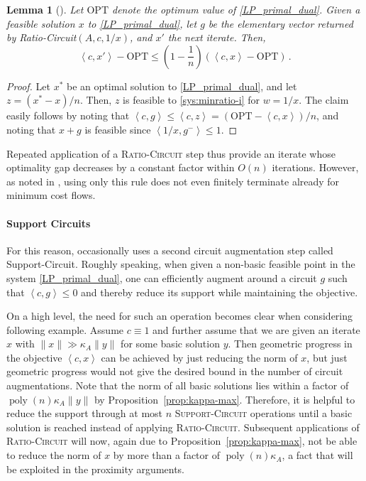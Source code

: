 \documentclass[11pt, a4paper]{article}
\newcommand{\pr}[2]{\left\langle #1, #2 \right\rangle}
\newcommand{\1}{\mathbbm{1}}
\newcommand{\OPT}{\mathrm{OPT}}
\newtheorem{lemma}[theorem]{Lemma}
\theoremstyle{case}
\begin{document}
\begin{lemma}[{\cite{mccormick-shioura-not-strongly}}]
    Let $\OPT$ denote the optimum value of \ref{LP_primal_dual}.
    Given a feasible solution $x$ to \ref{LP_primal_dual}, let 
        $g$ be the elementary vector returned by {\sc Ratio-Circuit}$(A,c,1/x)$, and $x'$ the next iterate. Then,
    \[\pr{c}{x'}-\OPT\le \left(1-\frac{1}{n}\right)\left(\pr{c}{x}-\OPT\right)\, .\]
\end{lemma}
\begin{proof}
Let $x^*$ be an optimal solution to \ref{LP_primal_dual}, and let $z=(x^*-x)/n$. Then, $z$ is feasible to 
\eqref{sys:minratio-i} for $w=1/x$. The claim easily follows by noting that $\pr{c}{g}\le \pr{c}{z}=(\OPT-\pr{c}{x})/n$, and noting that $x+g$ is feasible since  $\pr{1/x}{g^-}\le 1$.
\end{proof}

Repeated application of a \textsc{Ratio-Circuit} step thus provide an iterate whose optimality gap decreases by a constant factor within $O(n)$ iterations. However, as noted in \cite{mccormick-shioura-not-strongly}, using only this rule does not even finitely terminate already for minimum cost flows.

\paragraph{Support Circuits}
For this reason,
\cite{dadush2021circuit} occasionally uses a second
circuit augmentation step called {\sc Support-Circuit}. Roughly speaking, when given a non-basic feasible point in the system \ref{LP_primal_dual}, one can efficiently augment around a circuit $g$ such that $\pr{c}{g} \le 0$ and thereby reduce its support while maintaining the objective. 

On a high level, the need for such an operation becomes clear when considering following example. Assume $c \equiv 1$ and further assume that we are given an iterate $x$ with $\|x\| \gg \kappa_A \|y\|$ for some basic solution $y$. Then geometric progress in the objective $\pr{c}{x}$ can be achieved by just reducing the norm of $x$, but just geometric progress would not give the desired bound in the number of circuit augmentations. Note that the norm of all basic solutions lies within a factor of $\operatorname{poly}(n) \kappa_A\|y\|$ by Proposition~\ref{prop:kappa-max}. Therefore, it is helpful to reduce the support through at most $n$ \textsc{Support-Circuit} operations until a basic solution is reached instead of applying \textsc{Ratio-Circuit}. Subsequent applications of \textsc{Ratio-Circuit} will now, again due to Proposition~\ref{prop:kappa-max}, not be able to reduce the norm of $x$ by more than a factor of $\operatorname{poly}(n)\kappa_A$, a fact that will be exploited in the proximity arguments. 
\end{document}
